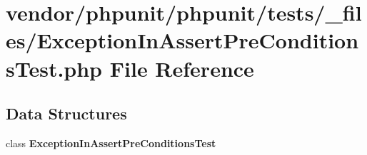 \section{vendor/phpunit/phpunit/tests/\+\_\+files/\+Exception\+In\+Assert\+Pre\+Conditions\+Test.php File Reference}
\label{_exception_in_assert_pre_conditions_test_8php}
\subsection*{Data Structures}
\begin{DoxyCompactItemize}
\item 
class {\bf Exception\+In\+Assert\+Pre\+Conditions\+Test}
\end{DoxyCompactItemize}
